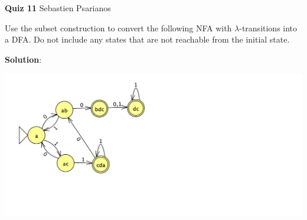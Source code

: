 \documentclass[11pt]{article}
\begin{document}
{\bf \large Quiz 11}
Sebastien Psarianos

\medskip

\begin{question}
Use the subset construction to convert the following NFA with $\lambda$-transitions into a DFA.
Do not include any states that are not reachable from the initial state.

\begin{center}
\end{center}
\end{question}

\begin{solution}
{\bf Solution}:

\begin{center}
\includegraphics[width=300mm,scale=0.5]{quiz11.png}
\end{center}
\end{solution}
\end{document}
